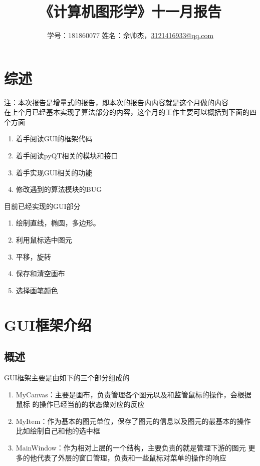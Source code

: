 \documentclass[a4paper,UTF8]{article}
\theoremstyle{definition}
\begin{document}
\title{\textbf{《计算机图形学》十一月报告}}
\author{学号：181860077 姓名：佘帅杰，\href{mailto:3121416933@qq.com}{3121416933@qq.com}}
\maketitle

\section{综述}
注：本次报告是增量式的报告，即本次的报告内内容就是这个月做的内容\\
在上个月已经基本实现了算法部分的内容，这个月的工作主要可以概括到下面的四个方面
\begin{enumerate}
    \item 着手阅读GUI的框架代码
    
    \item 着手阅读pyQT相关的模块和接口
    
    \item 着手实现GUI相关的功能
    
    \item 修改遇到的算法模块的BUG
\end{enumerate}

目前已经实现的GUI部分
\begin{enumerate}
    \item 绘制直线，椭圆，多边形。
    
    \item 利用鼠标选中图元
    
    \item 平移，旋转
    
    \item 保存和清空画布
    
    \item 选择画笔颜色
\end{enumerate}
\section{GUI框架介绍}
\subsection{概述}
GUI框架主要是由如下的三个部分组成的

\begin{enumerate}
    \item MyCanvas：主要是画布，负责管理各个图元以及和监管鼠标的操作，会根据鼠标
    的操作已经当前的状态做对应的反应
    
    \item MyItem：作为基本的图元单位，保存了图元的信息以及图元的最基本的操作
    比如绘制自己和他的选中框
    
    \item MainWindow：作为相对上层的一个结构，主要负责的就是管理下游的图元
    更多的他代表了外层的窗口管理，负责和一些鼠标对菜单的操作的响应
\end{enumerate}
\end{document}
